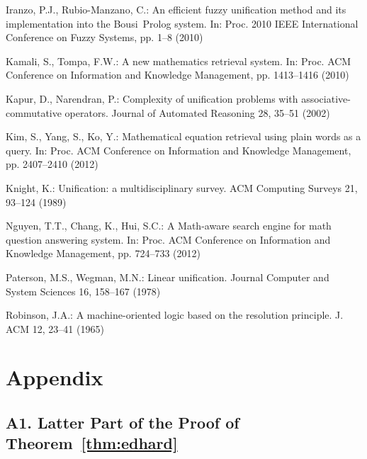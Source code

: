 \documentclass[a4paper]{llncs}
\begin{document}
\begin{thebibliography}{99}
Iranzo, P.J., Rubio-Manzano, C.:
An efficient fuzzy unification method and its implementation
into the Bousi~Prolog system.
In: Proc. 2010 IEEE International Conference on Fuzzy Systems,
pp. 1--8 (2010)

Kamali, S., Tompa, F.W.:
A new mathematics retrieval system.
In: Proc. ACM Conference on Information and Knowledge Management,
pp. 1413--1416 (2010)

Kapur, D., Narendran, P.:
Complexity of unification problems with associative-commutative operators.
Journal of Automated Reasoning 28, 35--51 (2002)

Kim, S., Yang, S., Ko, Y.:
Mathematical equation retrieval using plain words as a query.
In: Proc. ACM Conference on Information and Knowledge Management,
pp. 2407--2410 (2012)

Knight, K.:
Unification: a multidisciplinary survey.
ACM Computing Surveys 21, 93--124 (1989)


Nguyen, T.T., Chang, K., Hui, S.C.:
A Math-aware search engine for math question answering system.
In: Proc. ACM Conference on Information and Knowledge Management,
pp. 724--733 (2012)

Paterson, M.S., Wegman, M.N.:
Linear unification.
Journal Computer and System Sciences 16, 158--167 (1978)

Robinson, J.A.:
A machine-oriented logic based on the resolution principle.
J. ACM 12, 23--41 (1965)

\end{thebibliography}



\newpage

\section*{Appendix}

\subsection*{A1. Latter Part of the Proof of Theorem~\ref{thm:edhard}}
\end{document}
